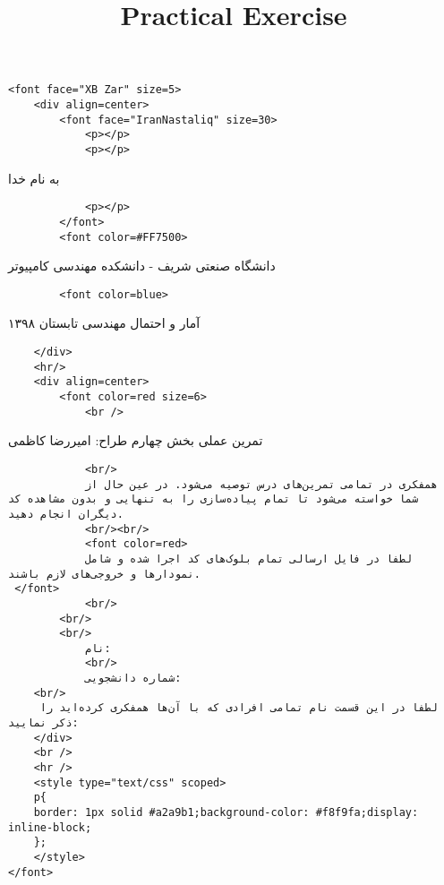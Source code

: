 \documentclass[11pt]{article}
\title{Practical Exercise}
\begin{document}
    
    
    \maketitle
    
    

    
    \begin{verbatim}
<font face="XB Zar" size=5>
    <div align=center>
        <font face="IranNastaliq" size=30>
            <p></p>
            <p></p>
\end{verbatim}

به نام خدا

\begin{verbatim}
            <p></p>
        </font>
        <font color=#FF7500>
\end{verbatim}

دانشگاه صنعتی شریف - دانشکده مهندسی کامپیوتر

\begin{verbatim}
        <font color=blue>
\end{verbatim}

آمار و احتمال مهندسی تابستان ۱۳۹۸

\begin{verbatim}
    </div>
    <hr/>
    <div align=center>
        <font color=red size=6>
            <br />
\end{verbatim}

تمرین عملی بخش چهارم طراح: امیررضا کاظمی

\begin{verbatim}
            <br/>
            همفکری در تمامی تمرین‌های درس توصیه می‌شود. در عین حال از شما خواسته می‌شود تا تمام پیاده‌سازی را به تنهایی و بدون مشاهده کد دیگران انجام دهید.
            <br/><br/>
            <font color=red>
            لطفا در فایل ارسالی تمام بلوک‌های کد اجرا شده و شامل نمودار‌ها و خروجی‌های لازم باشند.
 </font>
            <br/>
        <br/>
        <br/>
            نام:
            <br/>
            شماره دانشجویی:
    <br/>
     لطفا در این قسمت نام تمامی افرادی که با آن‌ها همفکری کرده‌اید را ذکر نمایید:
    </div>
    <br />
    <hr />
    <style type="text/css" scoped>
    p{
    border: 1px solid #a2a9b1;background-color: #f8f9fa;display: inline-block;
    };
    </style>
</font>
\end{verbatim}
\end{document}
